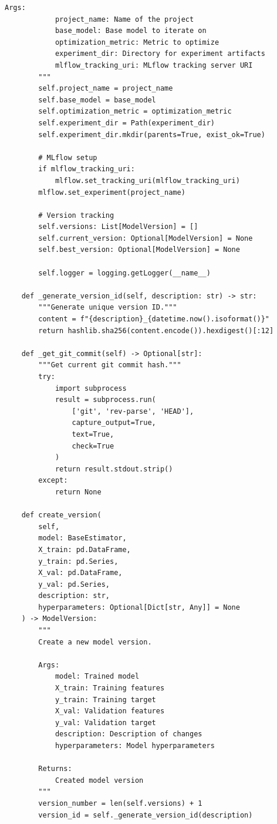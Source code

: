 \begin{lstlisting}[style=python, caption={Iterative Model Development Framework}]
        Args:
            project_name: Name of the project
            base_model: Base model to iterate on
            optimization_metric: Metric to optimize
            experiment_dir: Directory for experiment artifacts
            mlflow_tracking_uri: MLflow tracking server URI
        """
        self.project_name = project_name
        self.base_model = base_model
        self.optimization_metric = optimization_metric
        self.experiment_dir = Path(experiment_dir)
        self.experiment_dir.mkdir(parents=True, exist_ok=True)

        # MLflow setup
        if mlflow_tracking_uri:
            mlflow.set_tracking_uri(mlflow_tracking_uri)
        mlflow.set_experiment(project_name)

        # Version tracking
        self.versions: List[ModelVersion] = []
        self.current_version: Optional[ModelVersion] = None
        self.best_version: Optional[ModelVersion] = None

        self.logger = logging.getLogger(__name__)

    def _generate_version_id(self, description: str) -> str:
        """Generate unique version ID."""
        content = f"{description}_{datetime.now().isoformat()}"
        return hashlib.sha256(content.encode()).hexdigest()[:12]

    def _get_git_commit(self) -> Optional[str]:
        """Get current git commit hash."""
        try:
            import subprocess
            result = subprocess.run(
                ['git', 'rev-parse', 'HEAD'],
                capture_output=True,
                text=True,
                check=True
            )
            return result.stdout.strip()
        except:
            return None

    def create_version(
        self,
        model: BaseEstimator,
        X_train: pd.DataFrame,
        y_train: pd.Series,
        X_val: pd.DataFrame,
        y_val: pd.Series,
        description: str,
        hyperparameters: Optional[Dict[str, Any]] = None
    ) -> ModelVersion:
        """
        Create a new model version.

        Args:
            model: Trained model
            X_train: Training features
            y_train: Training target
            X_val: Validation features
            y_val: Validation target
            description: Description of changes
            hyperparameters: Model hyperparameters

        Returns:
            Created model version
        """
        version_number = len(self.versions) + 1
        version_id = self._generate_version_id(description)


\end{lstlisting}
